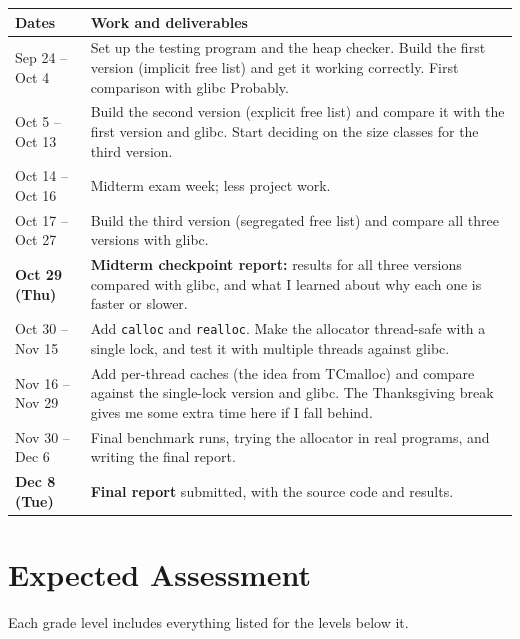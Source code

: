 \documentclass[12pt,letterpaper]{article}
\begin{document}
\medskip
\noindent
\begin{tabularx}{\textwidth}{@{}p{1.25in}X@{}}
\toprule
\textbf{Dates} & \textbf{Work and deliverables} \\
\midrule
Sep 24 -- Oct 4 & Set up the testing program and the heap checker. Build the first version (implicit free list) and get it working correctly. First comparison with glibc Probably. \\
\addlinespace
Oct 5 -- Oct 13 & Build the second version (explicit free list) and compare it with the first version and glibc. Start deciding on the size classes for the third version. \\
\addlinespace
Oct 14 -- Oct 16 & Midterm exam week; less project work. \\
\addlinespace
Oct 17 -- Oct 27 & Build the third version (segregated free list) and compare all three versions with glibc. \\
\addlinespace
\textbf{Oct 29 (Thu)} & \textbf{Midterm checkpoint report:} results for all three versions compared with glibc, and what I learned about why each one is faster or slower. \\
\addlinespace
Oct 30 -- Nov 15 & Add \texttt{calloc} and \texttt{realloc}. Make the allocator thread-safe with a single lock, and test it with multiple threads against glibc. \\
\addlinespace
Nov 16 -- Nov 29 & Add per-thread caches (the idea from TCmalloc) and compare against the single-lock version and glibc. The Thanksgiving break gives me some extra time here if I fall behind. \\
\addlinespace
Nov 30 -- Dec 6 & Final benchmark runs, trying the allocator in real programs, and writing the final report. \\
\addlinespace
\textbf{Dec 8 (Tue)} & \textbf{Final report} submitted, with the source code and results. \\
\bottomrule
\end{tabularx}

\section*{Expected Assessment}

Each grade level includes everything listed for the levels below it.
\end{document}
